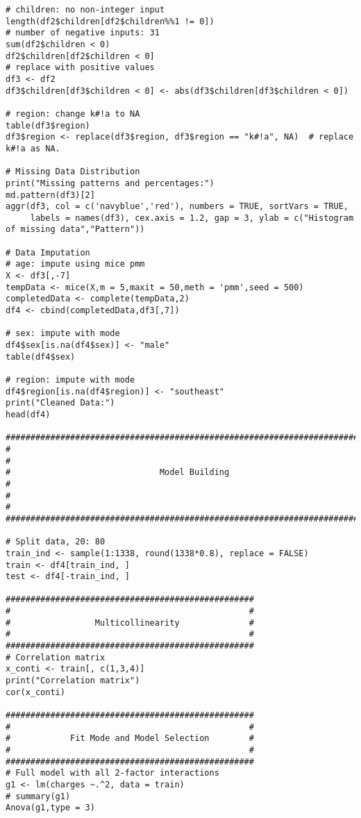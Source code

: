 \documentclass[12pt]{article}
\begin{document}
\begin{verbatim}
# children: no non-integer input
length(df2$children[df2$children%%1 != 0])
# number of negative inputs: 31
sum(df2$children < 0)
df2$children[df2$children < 0]
# replace with positive values
df3 <- df2
df3$children[df3$children < 0] <- abs(df3$children[df3$children < 0]) 

# region: change k#!a to NA
table(df3$region)
df3$region <- replace(df3$region, df3$region == "k#!a", NA)  # replace k#!a as NA.

# Missing Data Distribution
print("Missing patterns and percentages:")
md.pattern(df3)[2]
aggr(df3, col = c('navyblue','red'), numbers = TRUE, sortVars = TRUE, 
     labels = names(df3), cex.axis = 1.2, gap = 3, ylab = c("Histogram of missing data","Pattern"))

# Data Imputation
# age: impute using mice pmm
X <- df3[,-7]
tempData <- mice(X,m = 5,maxit = 50,meth = 'pmm',seed = 500)
completedData <- complete(tempData,2)
df4 <- cbind(completedData,df3[,7])

# sex: impute with mode
df4$sex[is.na(df4$sex)] <- "male"
table(df4$sex)

# region: impute with mode
df4$region[is.na(df4$region)] <- "southeast"
print("Cleaned Data:")
head(df4)

#######################################################################
#                                                                     #
#                              Model Building                         #
#                                                                     #
#######################################################################

# Split data, 20: 80
train_ind <- sample(1:1338, round(1338*0.8), replace = FALSE) 
train <- df4[train_ind, ] 
test <- df4[-train_ind, ] 

##################################################
#                                                #
#                 Multicollinearity              #
#                                                #
##################################################
# Correlation matrix
x_conti <- train[, c(1,3,4)] 
print("Correlation matrix") 
cor(x_conti)

##################################################
#                                                #
#            Fit Mode and Model Selection        # 
#                                                #
##################################################
# Full model with all 2-factor interactions
g1 <- lm(charges ~.^2, data = train)
# summary(g1)
Anova(g1,type = 3)


\end{verbatim}
\end{document}
